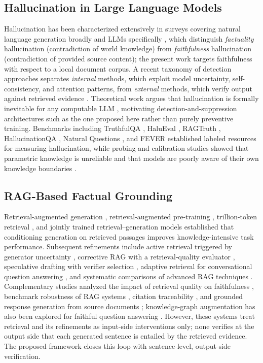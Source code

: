 \documentclass[journal]{IEEEtran}
\begin{document}
\subsection{Hallucination in Large Language Models}
Hallucination has been characterized extensively in surveys covering natural
language generation broadly \cite{ji2023survey} and LLMs specifically
\cite{huang2025survey}, which distinguish \emph{factuality} hallucination
(contradiction of world knowledge) from \emph{faithfulness} hallucination
(contradiction of provided source content); the present work targets
faithfulness with respect to a local document corpus. A recent taxonomy of
detection approaches separates \emph{internal} methods, which exploit model
uncertainty, self-consistency, and attention patterns, from \emph{external}
methods, which verify output against retrieved evidence
\cite{rahman2026survey}. Theoretical work argues that hallucination is
formally inevitable for any computable LLM \cite{xu2024inevitable},
motivating detection-and-suppression architectures such as the one proposed
here rather than purely preventive training. Benchmarks including TruthfulQA
\cite{lin2022truthfulqa}, HaluEval \cite{li2023halueval}, RAGTruth
\cite{niu2024ragtruth}, HallucinationQA \cite{liu2024hallucinationqa},
Natural Questions \cite{kwiatkowski2019nq}, and FEVER \cite{thorne2018fever}
established labeled resources for measuring hallucination, while probing and
calibration studies showed that parametric knowledge is unreliable and that
models are poorly aware of their own knowledge boundaries
\cite{petroni2019lama,mallen2023trust,cao2022know}.

\subsection{RAG-Based Factual Grounding}
Retrieval-augmented generation \cite{lewis2020rag}, retrieval-augmented
pre-training \cite{guu2020realm}, trillion-token retrieval
\cite{borgeaud2022retro}, and jointly trained retrieval--generation models
\cite{izacard2022atlas} established that conditioning generation on
retrieved passages improves knowledge-intensive task performance. Subsequent
refinements include active retrieval triggered by generator uncertainty
\cite{jiang2023flare}, corrective RAG with a retrieval-quality evaluator
\cite{yan2024crag}, speculative drafting with verifier selection
\cite{wang2024speculative}, adaptive retrieval for conversational question
answering \cite{zhu2023adaptive}, and systematic comparisons of advanced RAG
techniques \cite{fang2024improvingrag}. Complementary studies analyzed the
impact of retrieval quality on faithfulness \cite{guo2024retrieval},
benchmark robustness of RAG systems \cite{chen2024benchmarking}, citation
traceability \cite{xu2024citation}, and grounded response generation from
source documents \cite{xu2022grounding,ling2022knowledge}; knowledge-graph
augmentation has also been explored for faithful question answering
\cite{he2024kg}. However, these systems treat retrieval and its refinements
as input-side interventions only; none verifies at the output side that each
generated sentence is entailed by the retrieved evidence. The proposed
framework closes this loop with sentence-level, output-side verification.
\end{document}
